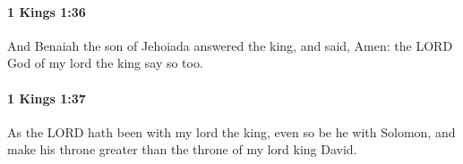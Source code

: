 		\paragraph{1 Kings 1:36} %
			\label{1KINGS-1-36}

			And Benaiah the son of Jehoiada answered the king, and said, Amen: the LORD God of my lord the king say so too.


		\paragraph{1 Kings 1:37} %
			\label{1KINGS-1-37}

			As the LORD hath been with my lord the king, even so be he with Solomon, and make his throne greater than the throne of my lord king David.


